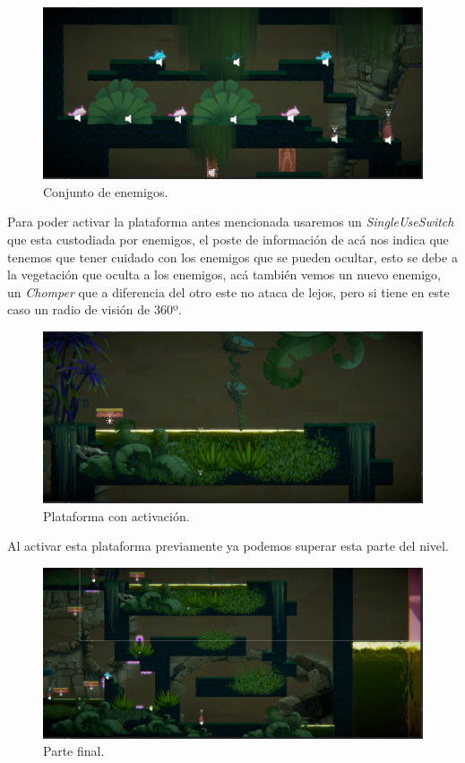 \documentclass[a4paper,12pt]{article}
\begin{document}
    \begin{figure}[ht]
        \centering                \includegraphics[width=1\textwidth]{images/CaptureIDSE05.PNG}
        \caption{Conjunto de enemigos.}
    \end{figure}     
    
    Para poder activar la plataforma antes mencionada usaremos un \textit{SingleUseSwitch} que esta custodiada por enemigos, el poste de información de acá nos indica que tenemos que tener cuidado con los enemigos que se pueden ocultar, esto se debe a la vegetación que oculta a los enemigos, acá también vemos un nuevo enemigo, un \textit{Chomper} que a diferencia del otro este no ataca de lejos, pero si tiene en este caso un radio de visión de 360º.
    
\clearpage
\newpage

    \begin{figure}[ht]
        \centering                \includegraphics[width=1\textwidth]{images/CaptureIDSE06.PNG}
        \caption{Plataforma con activación.}
    \end{figure}     
    
    Al activar esta plataforma previamente ya podemos superar esta parte del nivel.
    
    \begin{figure}[ht]
        \centering                \includegraphics[width=1\textwidth]{images/CaptureIDSE07.PNG}
        \caption{Parte final.}
    \end{figure}     
    
\end{document}
